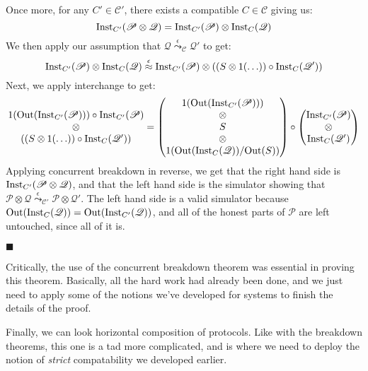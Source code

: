 \begin{theorem}
 Once more, for any $C' \in \mathscr{C}'$, there exists a compatible
$C \in \mathscr{C}$ giving us:
$$
\text{Inst}_{C'}(\mathscr{P} \otimes \mathscr{Q}) =
\text{Inst}_{C'}(\mathscr{P}) \otimes \text{Inst}_C(\mathscr{Q})
$$
We then apply our assumption that $\mathscr{Q} \overset{\epsilon}{\leadsto}_{\mathscr{C}} \mathscr{Q}'$
to get:
$$
\text{Inst}_{C'}(\mathscr{P}) \otimes \text{Inst}_C(\mathscr{Q})
\overset{\epsilon}{\approx}
\text{Inst}_{C'}(\mathscr{P}) \otimes ((S \otimes 1(\ldots)) \circ \text{Inst}_C(\mathscr{Q}'))
$$
Next, we apply interchange to get:
$$
\begin{matrix}
1(\text{Out}(\text{Inst}_{C'}(\mathscr{P}))) \circ \text{Inst}_{C'}(\mathscr{P})\cr
\otimes\cr
((S \otimes 1(\ldots)) \circ \text{Inst}_C(\mathscr{Q}'))
\end{matrix}
=
\begin{pmatrix}
1(\text{Out}(\text{Inst}_{C'}(\mathscr{P})))\cr
\otimes\cr
S\cr
\otimes\cr
1(\text{Out}(\text{Inst}_C(\mathscr{Q})) / \text{Out}(S))
\end{pmatrix}
\circ
\begin{pmatrix}
  \text{Inst}_{C'}(\mathscr{P})\cr
  \otimes\cr
  \text{Inst}_{C}(\mathscr{Q}')
\end{pmatrix}
$$
Applying concurrent breakdown in reverse, we get that the right hand
side is $\text{Inst}_{C'}(\mathscr{P} \otimes \mathscr{Q})$,
and that the left hand side is the simulator showing
that $\mathscr{P} \otimes \mathscr{Q} \overset{\epsilon}{\leadsto}_{\mathscr{C}'} \mathscr{P} \otimes \mathscr{Q}'$.
The left hand side is a valid simulator because
$\text{Out}(\text{Inst}_C(\mathscr{Q})) = \text{Out}(\text{Inst}_{C'}(\mathscr{Q}))$,
and all of the honest parts of $\mathscr{P}$ are left untouched,
since all of it is.

$\blacksquare$
\end{theorem}

Critically, the use of the concurrent breakdown theorem was
essential in proving this theorem.
Basically, all the hard work had already been done,
and we just need to apply some of the notions we've developed
for systems to finish the details of the proof.

Finally, we can look horizontal composition of protocols.
Like with the breakdown theorems, this one is a tad more complicated,
and is where we need to deploy the notion of \emph{strict}
compatability we developed earlier.

